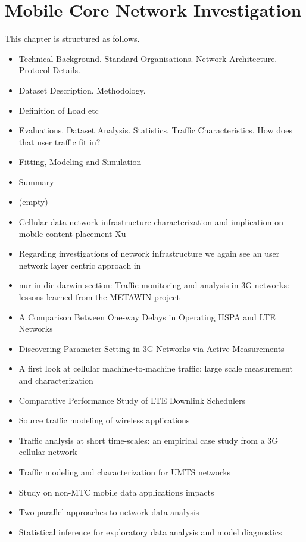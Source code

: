 \chapter{Mobile Core Network Investigation}
\label{chap:mobilenets}


This chapter is structured as follows.

\begin{itemize}
	\item Technical Background. Standard Organisations. Network Architecture. Protocol Details.
	\item Dataset Description. Methodology.
	\item Definition of Load etc
	\item Evaluations. Dataset Analysis. Statistics. Traffic Characteristics. How does that user traffic fit in?
	\item Fitting, Modeling and Simulation
	\item Summary
	\item (empty)
	\item Cellular data network infrastructure characterization and implication on mobile content placement Xu\cite{Xu:2011:CDN:2007116.2007149}
	\item Regarding investigations of network infrastructure we again see an user network layer centric approach in \cite{Xu:2011:CDN:2007116.2007149}
	\item nur in die darwin section: Traffic monitoring and analysis in 3G networks: lessons learned from the METAWIN project \cite{ricciato2006traffic}
	\item A Comparison Between One-way Delays in Operating HSPA and LTE Networks \cite{laner2012delaycomparison}
	\item Discovering Parameter Setting in 3G Networks via Active Measurements \cite{4640935}
	\item A first look at cellular machine-to-machine traffic: large scale measurement and characterization \cite{Shafiq:2012:FLC:2254756.2254767}
	\item Comparative Performance Study of LTE Downlink Schedulers \cite{biernacki2013ltescheduler}
	\item Source traffic modeling of wireless applications \cite{staehle2000source}
	\item Traffic analysis at short time-scales: an empirical case study from a 3G cellular network \cite{4570772}
	\item Traffic modeling and characterization for UMTS networks \cite{965876}
	\item Study on non-MTC mobile data applications impacts \cite{3gpp.22.801}
	\item Two parallel approaches to network data analysis \cite{baer2011two}
	\item Statistical inference for exploratory data analysis and model diagnostics \cite{Buja13112009}
\end{itemize}

